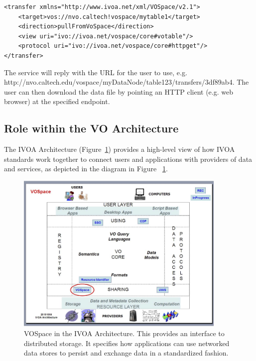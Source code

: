 \documentclass[11pt,a4paper]{ivoa}
\begin{document}
\begin{lstlisting}
<transfer xmlns="http://www.ivoa.net/xml/VOSpace/v2.1">
    <target>vos://nvo.caltech!vospace/mytable1</target>
    <direction>pullFromVoSpace</direction> 
    <view uri="ivo://ivoa.net/vospace/core#votable"/> 
    <protocol uri="ivo://ivoa.net/vospace/core#httpget"/>  
</transfer>
\end{lstlisting}

The service will reply with the URL for the user to use, e.g. http://nvo.caltech.edu/vospace/myDataNode/table123/transfers/3df89ab4. The user can then download the data file by pointing an HTTP client (e.g. web browser) at the specified endpoint.

\subsection{Role within the VO Architecture}

The IVOA Architecture (Figure~\ref{fig:archdiag}) provides a high-level view of how IVOA standards work together to connect users and applications with providers of data and services, as depicted in the diagram in Figure ~\ref{fig:archdiag}.

\begin{figure}
\centering


\includegraphics[width=0.9\textwidth]{archdiag.png}
\caption{VOSpace in the IVOA Architecture. This provides an interface to distributed storage. It specifies how applications can use networked data stores to persist and exchange data in a standardized fashion.}
\label{fig:archdiag}
\end{figure}
\end{document}

